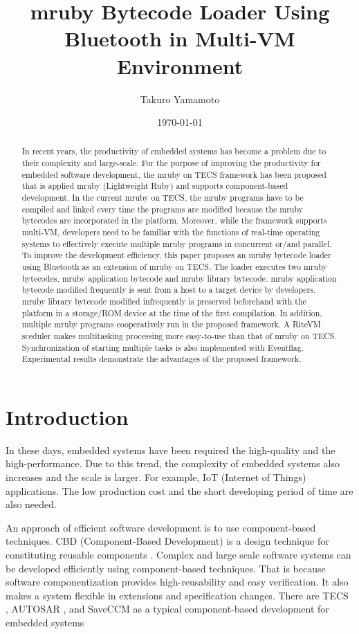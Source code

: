 \documentclass[conference,compsoc]{IEEEtran}
\title{mruby Bytecode Loader Using Bluetooth in Multi-VM Environment}
\author{Takuro Yamamoto}
\date{\today}
\begin{document}
\maketitle
\begin{abstract}
In recent years, the productivity of embedded systems has become a problem due to their complexity and large-scale.
For the purpose of improving the productivity for embedded software development, the mruby on TECS framework has been proposed that is applied mruby (Lightweight Ruby) and supports component-based development.
In the current mruby on TECS, the mruby programs have to be compiled and linked every time the programs are modified because the mruby bytecodes are incorporated in the platform.
Moreover, while the framework supports multi-VM, developers need to be familiar with the functions of real-time operating systems to effectively execute multiple mruby programs in concurrent or/and parallel.
To improve the development efficiency, this paper proposes an mruby bytecode loader using Bluetooth as an extension of mruby on TECS.
The loader executes two mruby bytecodes, mruby application bytecode and mruby library bytecode.
mruby application bytecode modified frequently is sent from a host to a target device by developers.
mruby library bytecode modified infrequently is preserved beforehand with the platform in a storage/ROM device at the time of the first compilation.
In addition, multiple mruby programs cooperatively run in the proposed framework.
A RiteVM sceduler makes multitasking processing more easy-to-use than that of mruby on TECS.
Synchronization of starting multiple tasks is also implemented with Eventflag. 
Experimental results demonstrate the advantages of the proposed framework.
\end{abstract}
\section{Introduction}
In these days, embedded systems have been required the high-quality and the high-performance.
Due to this trend, the complexity of embedded systems also increases and the scale is larger.
For example, IoT (Internet of Things) applications.
The low production cost and the short developing period of time are also needed.

An approach of efficient software development is to use component-based techniques.
CBD (Component-Based Development) is a design technique for constituting reusable components \cite{par:Crnkovic}.
Complex and large scale software systems can be developed efficiently using component-based techniques.
That is because software componentization provides high-reusability and easy verification.
It also makes a system flexible in extensions and specification changes.
There are TECS \cite{par:TECS}, AUTOSAR \cite{url:AUTOSAR}, and SaveCCM \cite{par:SAVEapproach} as a typical component-based development for embedded systems 
\end{document}
